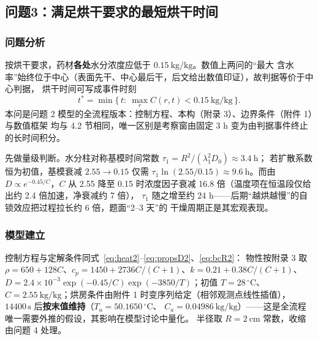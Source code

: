 \subsection{问题3：满足烘干要求的最短烘干时间}

\subsubsection{问题分析}

按烘干要求，药材\textbf{各处}水分浓度应低于 $0.15\ \mathrm{kg/kg}$。数值上两问的“最大
含水率”始终位于中心（表面先干、中心最后干，后文给出数值印证），故判据等价于中心判据，
烘干时间可写成事件时刻
\begin{equation}
  t^*=\min\big\{\,t:\ \max_r C(r,t)<0.15\ \mathrm{kg/kg}\,\big\}.
  \label{eq:event}
\end{equation}
本问是问题 2 模型的全流程版本：控制方程、本构（附录 3）、边界条件（附件 1）与数值框架
均与 4.2 节相同，唯一区别是考察窗由固定 3 h 变为由判据事件终止的长时间积分。

先做量级判断。水分柱对称基模时间常数 $\tau_1=R^2/(\lambda_1^2D_0)\approx3.4\ \mathrm{h}$；
若扩散系数恒为初值，基模衰减 $2.55\to0.15$ 仅需
$\tau_1\ln(2.55/0.15)\approx9.6\ \mathrm{h}$。而由 $D\propto e^{-0.45/C}$，$C$ 从 2.55
降至 0.15 时浓度因子衰减 16.8 倍（温度项在恒温段仅给出约 2.4 倍加速，净衰减约 7 倍），
$\tau_1$ 随之增至约 24 h——后期“越烘越慢”的自锁效应把过程拉长约 6 倍，题面“2–3 天”的
干燥周期正是其宏观表现。

\subsubsection{模型建立}

控制方程与定解条件同式~\eqref{eq:heat2}--\eqref{eq:propsD2}、\eqref{eq:bcR2}：
物性按附录 3 取 $\rho=650+128C$、$c_p=1450+2736C/(C+1)$、$k=0.21+0.38C/(C+1)$、
$D=2.4\times10^{-3}\exp(-0.45/C)\exp(-3850/T)$；初值 $T=28\,^{\circ}\mathrm{C}$、
$C=2.55\ \mathrm{kg/kg}$；烘房条件由附件 1 时变序列给定（相邻观测点线性插值），
$14400\,\mathrm{s}$ 后\textbf{按末值维持}（$T_a=50.1650\,^{\circ}\mathrm{C}$、
$C_a=0.04986\ \mathrm{kg/kg}$）——这是全流程唯一需要外推的假设，其影响在模型讨论中量化。
半径取 $R=2\ \mathrm{cm}$ 常数，收缩由问题 4 处理。

